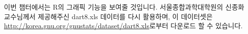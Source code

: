 \documentclass[../tutorial.tex]{subfiles}
\begin{document}

이번 챕터에서는 R의 그래픽 기능을 보여줄 것입니다.
서울종합과학대학원의 신종화 교수님께서 제공해주신 dart8.xls 데이터를 다시 활용하며, 이 데이터셋은 \href{http://korea.gnu.org/gnustats/dataset/dart8.xls}{http://korea.gnu.org/gnustats/dataset/dart8.xls}로부터 다운로드 할 수 있습니다.
\end{document}
